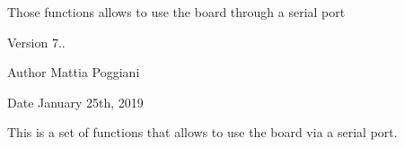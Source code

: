 Those functions allows to use the board through a serial port\begin{DoxyVersion}{Version}
7..
\end{DoxyVersion}
\begin{DoxyAuthor}{Author}
Mattia Poggiani
\end{DoxyAuthor}
\begin{DoxyDate}{Date}
January 25th, 2019
\end{DoxyDate}
This is a set of functions that allows to use the board via a serial port. 